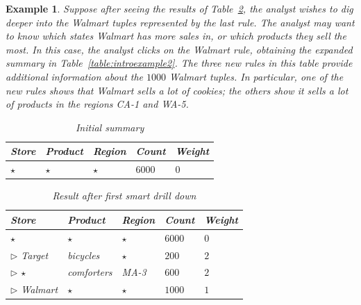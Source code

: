 \documentclass[10pt,journal,compsoc]{IEEEtran}
\newtheorem{example}[definition]{Example}
\begin{document}
\begin{example}
Suppose after seeing the results of Table~\ref{table:introexample},
the analyst wishes to dig deeper into the Walmart tuples
represented by the last rule.
The analyst may want to know
which states Walmart has more sales in, or which products they sell
the most. In this case, the analyst clicks on the Walmart rule,
obtaining the expanded summary in Table~\ref{table:introexample2}.
The three new rules in this table provide additional information
about the $1000$ Walmart tuples.
In particular, one of the new rules shows that
Walmart sells a lot of cookies; the others show it sells a lot of products in
the regions CA-1 and WA-5.

\begin{table}
\scriptsize
\centering
\begin{tabular}{| l | l | l | l | l |}
\hline Store & Product & Region & Count & Weight \\
\hline
$\star$ & $\star$ & $\star$ & $6000$ & $0$ \\ \hline
\end{tabular}
\caption{Initial summary}\label{table:introexample0}
\vspace{-10pt}
\end{table}

\begin{table}
\scriptsize
\centering
\begin{tabular}{| l | l | l | l | l |}
\hline Store & Product & Region & Count & Weight \\
\hline
$\star$ & $\star$ & $\star$ & $6000$ & $0$ \\ \hline
$\triangleright$ Target & bicycles & $\star$ & $200$ & $2$ \\ \hline
$\triangleright$ $\star$ & comforters & MA-3 & $600$ & $2$ \\ \hline
$\triangleright$ Walmart & $\star$ & $\star$ & $1000$ & $1$ \\ \hline
\end{tabular}
\caption{Result after first smart drill down}\label{table:introexample}
\vspace{-20pt}
\end{table}


\end{example}
\end{document}
